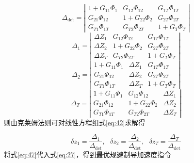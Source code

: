 \begin{equation}
\label{eq:43}
{\Delta _{\text{det}}} = \left| {\begin{array}{*{20}{c}}
  {1 + {G_{11}}{\Phi _1}}&{{G_{12}}{\Phi _{12}}}&{{G_{1T}}{\Phi _{1T}}} \\ 
  {{G_{21}}{\Phi _{12}}}&{1 + {G_{22}}{\Phi _2}}&{{G_{2T}}{\Phi _{2T}}} \\ 
  {{G_{T1}}{\Phi _{1T}}}&{{G_{T2}}{\Phi _{2T}}}&{1 + {G_T}{\Phi _T}} 
\end{array}} \right|
\end{equation}
\begin{equation}
\label{eq:44}
{\Delta _1} = \left| {\begin{array}{*{20}{c}}
  {\Delta {Z_1}}&{{G_{12}}{\Phi _{12}}}&{{G_{1T}}{\Phi _{1T}}} \\ 
  {\Delta {Z_2}}&{1 + {G_{22}}{\Phi _2}}&{{G_{2T}}{\Phi _{2T}}} \\ 
  {\Delta {Z_T}}&{{G_{T2}}{\Phi _{2T}}}&{1 + {G_T}{\Phi _T}} 
\end{array}} \right|
\end{equation}
\begin{equation}
\label{eq:45}
{\Delta _2} = \left| {\begin{array}{*{20}{c}}
  {1 + {G_{11}}{\Phi _1}}&{\Delta {Z_1}}&{{G_{1T}}{\Phi _{1T}}} \\ 
  {{G_{21}}{\Phi _{12}}}&{\Delta {Z_2}}&{{G_{2T}}{\Phi _{2T}}} \\ 
  {{G_{T1}}{\Phi _{1T}}}&{\Delta {Z_T}}&{1 + {G_T}{\Phi _T}} 
\end{array}} \right|
\end{equation}
\begin{equation}
\label{eq:46}
{\Delta _T} = \left| {\begin{array}{*{20}{c}}
  {1 + {G_{11}}{\Phi _1}}&{{G_{12}}{\Phi _{12}}}&{\Delta {Z_1}} \\ 
  {{G_{21}}{\Phi _{12}}}&{1 + {G_{22}}{\Phi _2}}&{\Delta {Z_2}} \\ 
  {{G_{T1}}{\Phi _{1T}}}&{{G_{T2}}{\Phi _{2T}}}&{\Delta {Z_T}} 
\end{array}} \right|
\end{equation}
则由克莱姆法则可对线性方程组式\eqref{eq:42}求解得

\begin{equation}
\label{eq:47}
{\delta z_1} = \frac{{{\Delta _1}}}{{{\Delta _{\text{det}}}}},{\text{ }}{\delta z_2} = \frac{{{\Delta _2}}}{{{\Delta _{\text{det}}}}},{\text{ }}{\delta z_T} = \frac{{{\Delta _T}}}{{{\Delta _{\text{det}}}}}
\end{equation}
将式\eqref{eq:47}代入式\eqref{eq:27}，得到最优规避制导加速度指令

